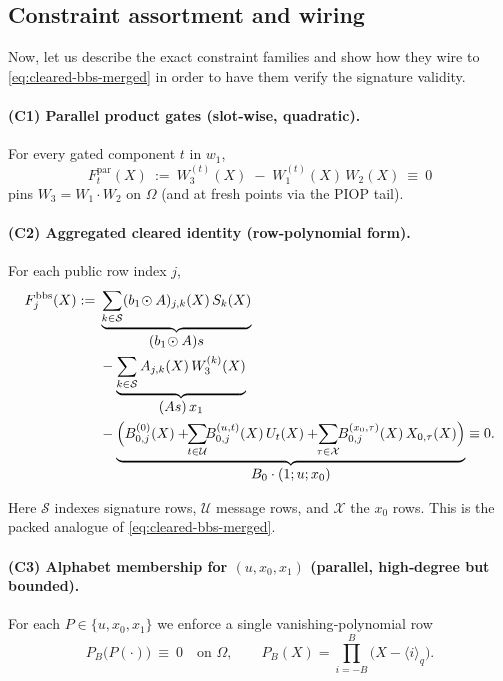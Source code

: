 \subsection{Constraint assortment and wiring}
\label{subsec:merge-constraints}

Now, let us describe the exact constraint families and show how they wire to \eqref{eq:cleared-bbs-merged} in order to have them verify the signature validity.

\paragraph{(C1) Parallel product gates (slot‑wise, quadratic).}
For every gated component $t$ in $w_1$,
\begin{equation}\label{eq:par-gate}
  F^{\mathrm{par}}_{t}(X)\ :=\ W^{(t)}_{3}(X)\;-\;W^{(t)}_{1}(X)\,W_{2}(X)\ \equiv\ 0
\end{equation}
pins $W_3=W_1\cdot W_2$ on $\Omega$ (and at fresh points via the PIOP tail).

\paragraph{(C2) Aggregated cleared identity (row‑polynomial form).}
For each public row index $j$,
\begin{equation}\label{eq:agg-bbs}
\begin{aligned}
F^{\mathrm{bbs}}_j(X)
  :=\;& \underbrace{\sum_{k\in\mathcal S} (b_1\!\Had A)_{j,k}(X)\,S_k(X)}_{\textstyle (b_1\!\Had A)s}  \\
  &-\underbrace{\sum_{k\in\mathcal S} A_{j,k}(X)\,W^{(k)}_{3}(X)}_{\textstyle (A s)\,x_1}  \\
  &-\underbrace{\Bigl(B_{0,j}^{(0)}(X)
     +\!\!\sum_{t\in\mathcal U}\!\! B_{0,j}^{(u,t)}(X)\,U_t(X)
     +\!\!\sum_{\tau\in\mathcal X}\!\! B_{0,j}^{(x_0,\tau)}(X)\,X_{0,\tau}(X)\Bigr)}_{\textstyle B_0\cdot(1;u;x_0)}
  \equiv 0 .
\end{aligned}
\end{equation}

Here $\mathcal S$ indexes signature rows, $\mathcal U$ message rows, and $\mathcal X$ the $x_0$ rows. This is the packed analogue of \eqref{eq:cleared-bbs-merged}.

\paragraph{(C3) Alphabet membership for $(u,x_0,x_1)$ (parallel, high‑degree but bounded).}
For each $P\in\{u,x_0,x_1\}$ we enforce a single vanishing‑polynomial row
\[
  P_B\!\big(P(\cdot)\big)\ \equiv\ 0 \quad\text{on }\Omega,\qquad
  P_B(X)=\prod_{i=-B}^{B}\bigl(X-\langle i\rangle_q\bigr).
\]

